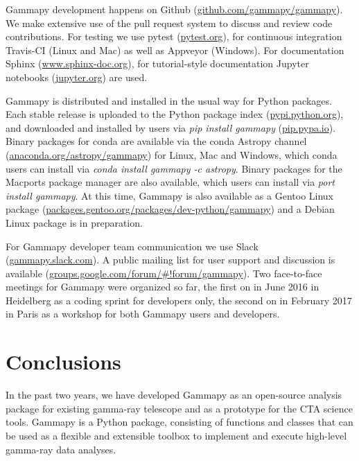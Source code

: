 \documentclass{PoS}
\newcommand{\urlGammapySlack}{\href{https://gammapy.slack.com}{gammapy.slack.com}}
\newcommand{\urlGammapyGithub}{\href{https://github.com/gammapy/gammapy}{github.com/gammapy/gammapy}}
\newcommand{\urlPytest}{\href{https://pytest.org}{pytest.org}}
\newcommand{\urlSphinx}{\href{http://www.sphinx-doc.org}{www.sphinx-doc.org}}
\newcommand{\urlJupyter}{\href{https://jupyter.org}{jupyter.org}}
\newcommand{\urlPypi}{\href{https://pypi.python.org}{pypi.python.org}}
\newcommand{\urlPip}{\href{https://pip.pypa.io}{pip.pypa.io}}
\newcommand{\urlAnacondaGammapy}{\href{https://anaconda.org/astropy/gammapy}{anaconda.org/astropy/gammapy}}
\newcommand{\urlGentooGammapy}{\href{https://packages.gentoo.org/packages/dev-python/gammapy}{packages.gentoo.org/packages/dev-python/gammapy}}
\newcommand{\urlGammapyForum}{\href{https://groups.google.com/forum/\#!forum/gammapy}{groups.google.com/forum/\#!forum/gammapy}}
\begin{document}
Gammapy development happens on Github (\urlGammapyGithub). We make extensive use
of the pull request system to discuss and review code contributions. For testing
we use pytest (\urlPytest), for continuous integration Travis-CI (Linux and Mac)
as well as Appveyor (Windows). For documentation Sphinx (\urlSphinx), for
tutorial-style documentation Jupyter notebooks (\urlJupyter) are used.

Gammapy is distributed and installed in the usual way for Python packages. Each
stable release is uploaded to the Python package index (\urlPypi), and
downloaded and installed by users via {\it pip install gammapy} (\urlPip).
Binary packages for conda are available via the conda Astropy channel
(\urlAnacondaGammapy) for Linux, Mac and Windows, which conda users can install
via {\it conda install gammapy -c astropy}. Binary packages for the Macports
package manager are also available, which users can install via {\it port
install gammapy}. At this time, Gammapy is also available as a Gentoo Linux
package (\urlGentooGammapy) and a Debian Linux package is in preparation.

For Gammapy developer team communication we use Slack (\urlGammapySlack). A
public mailing list for user support and discussion is available
(\urlGammapyForum). Two face-to-face meetings for Gammapy were organized so far,
the first on in June 2016 in Heidelberg as a coding sprint for developers only,
the second on in February 2017 in Paris as a workshop for both Gammapy users and
developers.


\section{Conclusions}
\label{sec:conclusions}

In the past two years, we have developed Gammapy as an open-source analysis
package for existing gamma-ray telescope and as a prototype for the CTA science
tools. Gammapy is a Python package, consisting of functions and classes that can
be used as a flexible and extensible toolbox to implement and execute high-level
gamma-ray data analyses.
\end{document}
